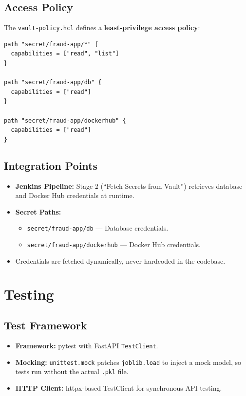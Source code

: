 \documentclass[12pt,a4paper]{article}
\begin{document}
\subsection{Access Policy}

The \texttt{vault-policy.hcl} defines a \textbf{least-privilege access policy}:

\begin{lstlisting}[language={},caption={vault-policy.hcl}]
path "secret/fraud-app/*" {
  capabilities = ["read", "list"]
}

path "secret/fraud-app/db" {
  capabilities = ["read"]
}

path "secret/fraud-app/dockerhub" {
  capabilities = ["read"]
}
\end{lstlisting}

\subsection{Integration Points}

\begin{itemize}
    \item \textbf{Jenkins Pipeline:} Stage 2 (``Fetch Secrets from Vault'') retrieves database and Docker Hub credentials at runtime.
    \item \textbf{Secret Paths:}
    \begin{itemize}
        \item \texttt{secret/fraud-app/db} --- Database credentials.
        \item \texttt{secret/fraud-app/dockerhub} --- Docker Hub credentials.
    \end{itemize}
    \item Credentials are fetched dynamically, never hardcoded in the codebase.
\end{itemize}

\section{Testing}

\subsection{Test Framework}

\begin{itemize}
    \item \textbf{Framework:} pytest with FastAPI \texttt{TestClient}.
    \item \textbf{Mocking:} \texttt{unittest.mock} patches \texttt{joblib.load} to inject a mock model, so tests run without the actual \texttt{.pkl} file.
    \item \textbf{HTTP Client:} httpx-based TestClient for synchronous API testing.
\end{itemize}
\end{document}
